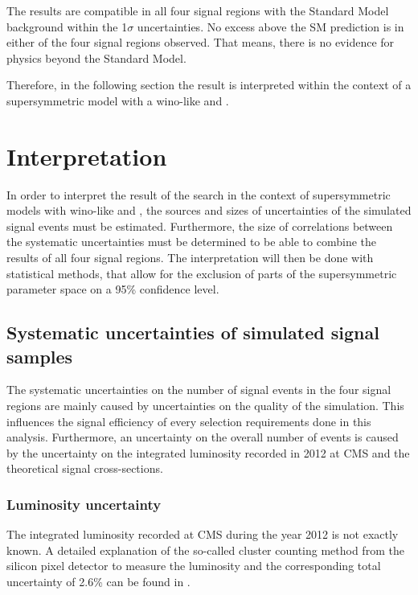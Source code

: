 The results are compatible in all four signal regions with the Standard Model background within the 1$\sigma$ uncertainties.
No excess above the SM prediction is in either of the four signal regions observed.
That means, there is no evidence for physics beyond the Standard Model.

Therefore, in the following section the result is interpreted within the context of a supersymmetric model with a wino-like \chipm and \chiO.

\chapter{Interpretation}
\label{sec:Interpretation}
In order to interpret the result of the search in the context of supersymmetric models with wino-like \chipm and \chiO, the sources and sizes of uncertainties of the simulated signal events must be estimated.
Furthermore, the size of correlations between the systematic uncertainties must be determined to be able to combine the results of all four signal regions.
The interpretation will then be done with statistical methods, that allow for the exclusion of parts of the supersymmetric parameter space on a 95\% confidence level.

\section{Systematic uncertainties of simulated signal samples}
The systematic uncertainties on the number of signal events in the four signal regions are mainly caused by uncertainties on the quality of the simulation.
This influences the signal efficiency of every selection requirements done in this analysis.
Furthermore, an uncertainty on the overall number of events is caused by the uncertainty on the integrated luminosity recorded in 2012 at CMS and the theoretical signal cross-sections.

\subsection*{Luminosity uncertainty}
The integrated luminosity recorded at CMS during the year 2012 is not exactly known. 
A detailed explanation of the so-called cluster counting method from the silicon pixel detector to measure the luminosity and the corresponding total uncertainty of 2.6\% can be found in \cite{bib:CMS:Lumi_PAS}.

